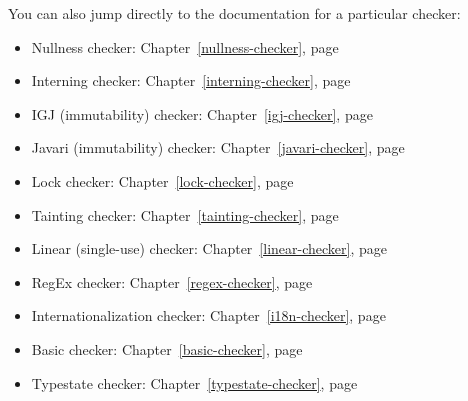 \documentclass[10pt]{report}
\newcommand{\htmlhr}{\relax}
\begin{document}
\newcommand{\refwithpage}[1]{\ref{#1}, page~\pageref{#1}}
\newcommand{\chapterpageref}[1]{Chapter~\refwithpage{#1}}

\medskip

\noindent
You can also jump directly to the documentation for a particular checker:
\begin{itemize}
\item Nullness checker: \chapterpageref{nullness-checker}
\item Interning checker: \chapterpageref{interning-checker}
\item IGJ (immutability) checker: \chapterpageref{igj-checker}
\item Javari (immutability) checker: \chapterpageref{javari-checker}
\item Lock checker: \chapterpageref{lock-checker}
\item Tainting checker: \chapterpageref{tainting-checker}
\item Linear (single-use) checker: \chapterpageref{linear-checker}
\item RegEx checker: \chapterpageref{regex-checker}
\item Internationalization checker: \chapterpageref{i18n-checker}
\item Basic checker: \chapterpageref{basic-checker}
\item Typestate checker: \chapterpageref{typestate-checker}
\end{itemize}


\tableofcontents
\newpage




















\htmlhr


\end{document}
